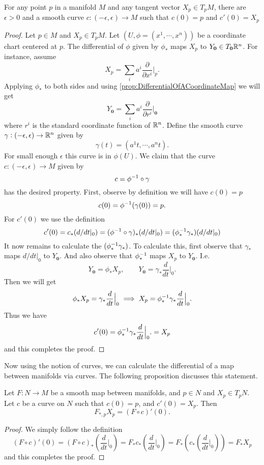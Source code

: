 \begin{proposition}
	For any point $ p $ in a manifold $ M $ and any tangent vector $ X_p \in T_pM $, there are $ \epsilon>0 $ and a smooth curve $ c:(-\epsilon,\epsilon) \to M $ such that $ c(0) = p $ and $ c'(0) = X_p $
\end{proposition}
\begin{proof}
	Let $ p \in M $ and $ X_p \in T_pM $.  Let $ (U,\phi = (x^1,\cdots,x^n)) $ be a coordinate chart centered at $ p $. The differential of $ \phi $ given by $ \phi_* $ maps $ X_p $ to $ Y_{\mathbf{0}} \in T_\mathbf{0}\mathbb{R}^n $. For instance, assume 
	\[ X_p = \sum_i a^i \frac{\partial}{\partial  x^i}\big|_{p}. \]
	Applying $ \phi_* $ to both sides and using \autoref{prop:DifferentialOfACoordinateMap} we will get
	\[ Y_\mathbf{0} =  \sum_i a^i \frac{\partial}{\partial  r^i}\big|_{\mathbf{0}}  \]
	where $ r^i $ is the standard coordinate function of $ \mathbb{R}^n $. Define the smooth curve $ \gamma: (-\epsilon, \epsilon) \to \mathbb{R}^n $ given by
	\[ \gamma(t) = (a^1t, \cdots, a^n t). \]
	For small enough $ \epsilon $ this curve is in $ \phi(U) $. We claim that the curve $ c:(-\epsilon,\epsilon)\to M $ given by
	\[ c = \phi^{-1} \circ \gamma \] 
	has the desired property. First, observe by definition we will have $ c(0) = p $
	\[ c(0) = \phi^{-1}(\gamma(0)) = p. \]
	For $ c'(0) $ we use the definition
	\[ c'(0) = c_*(d/dt|_{0}) = (\phi^{-1}\circ \gamma)_*(d/dt|_{0}) = (\phi^{-1}_*  \gamma_*)(d/dt|_{0})  \]
	It now remains to calculate the $ (\phi^{-1}_* \gamma_*) $. To calculate this, first observe that $ \gamma_* $ maps $ d/dt|_0 $ to $ Y_\mathbf{0} $. And also observe that $ \phi^{-1}_* $ maps $ X_p $ to $ Y_\mathbf{0} $. I.e.
	\[ Y_\mathbf{0} = \phi_* X_p, \qquad Y_\mathbf{0} = \gamma_* \frac{d}{dt}\big|_0. \]
	Then we will get
	\[ \phi_* X_p = \gamma_* \frac{d}{d  t}\big|_{0} \implies X_p = \phi^{-1}_* \gamma_* \frac{d}{dt}\big|_0. \]
	Thus we have
	\[ c'(0) =  \phi^{-1}_* \gamma_* \frac{d}{dt}\big|_0. = X_p\]
	and this completes the proof.
\end{proof}

Now using the notion of curves, we can calculate the differential of a map between manifolds via curves. The following proposition discusses this statement.
\begin{proposition}
	Let $ F: N  \to M$ be a smooth map between manifolds, and $ p \in N $ and $ X_p \in T_pN $. Let $ c $ be a curve on $ N $ such that $ c(0) = p $, and $ c'(0) = X_p $. Then
	\[ F_{*,p} X_p = (F\circ c)' (0). \]
\end{proposition}
\begin{proof}
	We simply follow the definition
	\[(F\circ c)'(0) = (F\circ c)_* (\frac{d}{dt}\big|_0) = F_* c_* (\frac{d}{dt}\big|_0) = F_* \left(  c_* (\frac{d}{dt}\big|_0) \right) = F_* X_p \]
	and this completes the proof.
\end{proof}



